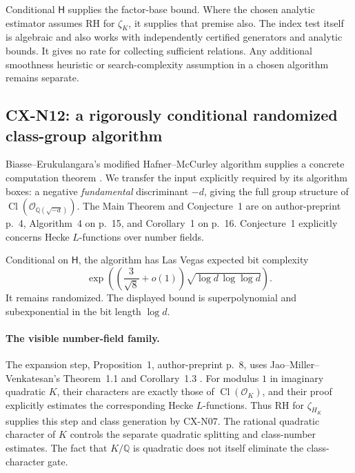 \documentclass[11pt,a4paper]{article}
\begin{document}
Conditional \(\mathsf H\) supplies the factor-base bound. Where the
chosen analytic estimator assumes RH for \(\zeta_K\), it supplies
that premise also. The index test itself is algebraic and also works
with independently certified generators and analytic bounds.
It gives no rate for collecting sufficient relations. Any additional
smoothness heuristic or search-complexity assumption in a chosen
algorithm remains separate.

\subsection{CX-N12: a rigorously conditional randomized class-group algorithm}
\label{cx-n12}

Biasse--Erukulangara's modified Hafner--McCurley algorithm supplies a
concrete computation theorem \cite{CXNBiasseErukulangara}. We transfer
the input explicitly required by its algorithm boxes: a negative
\emph{fundamental} discriminant \(-d\), giving the full group structure
of \(\operatorname{Cl}(\mathcal O_{\mathbb Q(\sqrt{-d})})\).
The Main Theorem and Conjecture~1 are on author-preprint p.~4,
Algorithm~4 on p.~15, and Corollary~1 on p.~16.
Conjecture~1 explicitly concerns Hecke \(L\)-functions over number fields.

Conditional on \(\mathsf H\), the algorithm has Las Vegas expected
bit complexity
\[
 \exp\!\left(\left(\frac3{\sqrt8}+o(1)\right)
                    \sqrt{\log d\,\log\log d}\right).           \tag{N12.1}
\]
It remains randomized. The displayed bound is superpolynomial and
subexponential in the bit length \(\log d\).

\paragraph{The visible number-field family.}
The expansion step, Proposition~1, author-preprint p.~8, uses
Jao--Miller--Venkatesan's Theorem~1.1 and Corollary~1.3
\cite[arXiv version, pp.~3--4; proof pp.~9--10]{CXNJMV09}.
For modulus \(1\) in imaginary quadratic \(K\), their characters are
exactly those of \(\operatorname{Cl}(\mathcal O_K)\), and their proof
explicitly estimates the corresponding Hecke \(L\)-functions.
Thus RH for \(\zeta_{H_K}\) supplies this step and class generation
by CX-N07. The rational quadratic character of \(K\) controls the
separate quadratic splitting and class-number estimates.
The fact that \(K/\mathbb Q\) is quadratic does not itself eliminate
the class-character gate.
\end{document}
